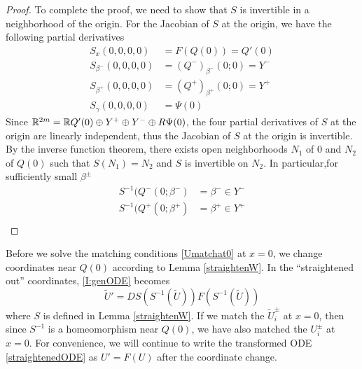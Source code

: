 \documentclass[thesis.tex]{subfiles}
\begin{document}
\begin{lemma}
\begin{proof}
To complete the proof, we need to show that $S$ is invertible in a neighborhood of the origin. For the Jacobian of $S$ at the origin, we have the following partial derivatives
\begin{align*}
S_x(0, 0, 0, 0) &= F(Q(0)) = Q'(0) \\
S_{\beta^-}(0, 0, 0, 0) &= (Q^-)_{\beta^-}(0; 0) = Y^- \\
S_{\beta^+}(0, 0, 0, 0) &= (Q^+)_{\beta^+}(0; 0) = Y^+ \\
S_{\gamma}(0, 0, 0, 0) &= \Psi(0)
\end{align*}
Since ${\mathbb R}^{2m} = {\mathbb R} Q'(0) \oplus Y^+ \oplus Y^- \oplus R \Psi(0)$, the four partial derivatives of $S$ at the origin are linearly independent, thus the Jacobian of $S$ at the origin is invertible. By the inverse function theorem, there exists open neighborhoods $N_1$ of 0 and $N_2$ of $Q(0)$ such that $S(N_1) = N_2$ and $S$ is invertible on $N_2$. In particular,for sufficiently small $\beta^\pm$
\begin{align*}
S^{-1}(Q^-(0; \beta^-) &= \beta^- \in Y^- \\
S^{-1}(Q^+(0; \beta^+) &= \beta^+ \in Y^+ \\
\end{align*}
\end{proof}
\end{lemma}

Before we solve the matching conditions \eqref{Umatchat0} at $x = 0$, we change coordinates near $Q(0)$ according to Lemma \ref{straightenW}. In the ``straightened out'' coordinates, \eqref{I:genODE} becomes
\begin{equation}\label{straightenedODE}
\tilde{U}' = DS(S^{-1}(\tilde{U})) F( S^{-1}(\tilde{U}) )
\end{equation}
where $S$ is defined in Lemma \ref{straightenW}. If we match the $\tilde{U}_i^\pm$ at $x = 0$, then since $S^{-1}$ is a homeomorphism near $Q(0)$, we have also matched the $U_i^\pm$ at $x = 0$. For convenience, we will continue to write the transformed ODE \eqref{straightenedODE} as $U' = F(U)$ after the coordinate change.
\end{document}
